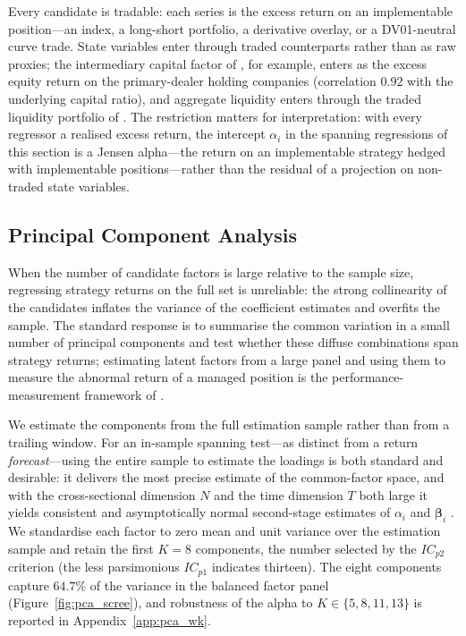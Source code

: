 Every candidate is tradable: each series is the excess return on an
implementable position---an index, a long-short portfolio, a
derivative overlay, or a DV01-neutral curve trade. State variables
enter through traded counterparts rather than as raw proxies; the
intermediary capital factor of \citet{he2017intermediary}, for
example, enters as the excess equity return on the primary-dealer
holding companies (correlation $0.92$ with the underlying capital
ratio), and aggregate liquidity enters through the traded liquidity
portfolio of \citet{pastor2003liquidity}. The restriction matters for
interpretation: with every regressor a realised excess return, the
intercept $\alpha_i$ in the spanning regressions of this section is a
Jensen alpha---the return on an implementable strategy hedged with
implementable positions---rather than the residual of a projection on
non-traded state variables.



\subsection{Principal Component Analysis}
\label{sec:pca}

When the number of candidate factors is large relative to the sample
size, regressing strategy returns on the full set is unreliable: the
strong collinearity of the candidates inflates the variance of the
coefficient estimates and overfits the sample. The standard response
is to summarise the common variation in a small number of principal
components and test whether these diffuse combinations span strategy
returns; estimating latent factors from a large panel and using them
to measure the abnormal return of a managed position is the
performance-measurement framework of \citet{connor1986performance,
connor1988risk}.

We estimate the components from the full estimation sample rather
than from a trailing window. For an in-sample spanning test---as
distinct from a return \emph{forecast}---using the entire sample to
estimate the loadings is both standard and desirable: it delivers the
most precise estimate of the common-factor space, and with the
cross-sectional dimension $N$ and the time dimension $T$ both large it
yields consistent and asymptotically normal second-stage estimates of
$\alpha_i$ and $\boldsymbol{\beta}_i$ \citep{giglio2021asset}. We
standardise each factor to zero mean and unit variance over the
estimation sample and retain the first $K = 8$ components, the number
selected by the \citet{bai2002determining} $IC_{p2}$ criterion (the
less parsimonious $IC_{p1}$ indicates thirteen). The eight components
capture $64.7\%$ of the variance in the balanced factor panel
(Figure~\ref{fig:pca_scree}), and robustness of the alpha to
$K \in \{5, 8, 11, 13\}$ is reported in Appendix~\ref{app:pca_wk}.

